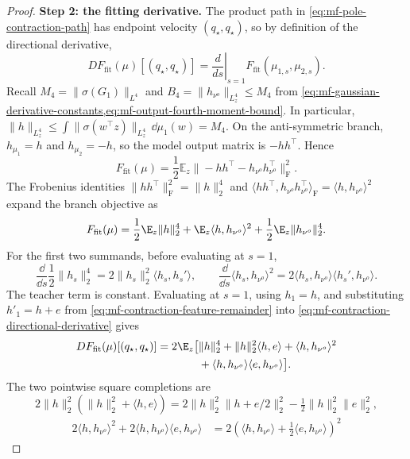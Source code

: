 \begin{proof}
\par\noindent\textbf{Step 2: the fitting derivative.}
The product path in \cref{eq:mf-pole-contraction-path} has endpoint velocity
\((q_\star,q_\star)\), so by definition of the directional derivative,
\begin{equation}
\label{eq:mf-contraction-directional-derivative}
 DF_{\mathrm{fit}}(\mu)[(q_\star,q_\star)]
 =\left.\frac d{ds}\right|_{s=1}
   F_{\mathrm{fit}}(\mu_{1,s},\mu_{2,s}).
\end{equation}
Recall \(M_4=\|\sigma(G_1)\|_{L^4}\) and
\(B_4=\|h_{\nu^o}\|_{L^4_z}\le M_4\) from
\cref{eq:mf-gaussian-derivative-constants,eq:mf-output-fourth-moment-bound}.
In particular,
\(\|h\|_{L^4_z}\le\int\|\sigma(w^\top z)\|_{L^4_z}\,\dd\mu_1(w)=M_4\).
On the anti-symmetric branch,
\(h_{\mu_1}=h\) and \(h_{\mu_2}=-h\), so the model output matrix is
\(-hh^\top\).  Hence
\[
 F_{\mathrm{fit}}(\mu)
 =\frac12\mathbb E_z
   \|-hh^\top-h_{\nu^o}h_{\nu^o}^\top\|_{\mathrm F}^2.
\]
The Frobenius identities
\(\|hh^\top\|_{\mathrm F}^2=\|h\|_2^4\) and
\(\langle hh^\top,h_{\nu^o}h_{\nu^o}^\top\rangle_{\mathrm F}
=\langle h,h_{\nu^o}\rangle^2\) expand the branch objective as
\begin{equation}
\label{eq:mf-branch-energy-expansion}
 F_{\mathrm{fit}}(\mu)
 =\frac12\E_z\|h\|_2^4
  +\E_z\langle h,h_{\nu^o}\rangle^2
  +\frac12\E_z\|h_{\nu^o}\|_2^4.
\end{equation}
For the first two summands, before evaluating at \(s=1\),
\[
 \frac{\dd}{\dd s}\frac12\|h_s\|_2^4
 =2\|h_s\|_2^2\langle h_s,h_s'\rangle,\qquad
 \frac{\dd}{\dd s}\langle h_s,h_{\nu^o}\rangle^2
 =2\langle h_s,h_{\nu^o}\rangle\langle h_s',h_{\nu^o}\rangle.
\]
The teacher term is constant.  Evaluating at \(s=1\), using \(h_1=h\),
and substituting \(h'_1=h+e\) from
\cref{eq:mf-contraction-feature-remainder} into
\cref{eq:mf-contraction-directional-derivative} gives
\begin{align}
 DF_{\mathrm{fit}}(\mu)[(q_\star,q_\star)]
 =2\E_z\bigl[&\|h\|_2^4+\|h\|_2^2\langle h,e\rangle
   +\langle h,h_{\nu^o}\rangle^2\notag\\
   &+\langle h,h_{\nu^o}\rangle\langle e,h_{\nu^o}\rangle\bigr].
\end{align}
The two pointwise square completions are
\[
 2\|h\|_2^2(\|h\|_2^2+\langle h,e\rangle)
 =2\|h\|_2^2\|h+e/2\|_2^2-\tfrac12\|h\|_2^2\|e\|_2^2,
\]
\[
\begin{aligned}
 2\langle h,h_{\nu^o}\rangle^2
 +2\langle h,h_{\nu^o}\rangle\langle e,h_{\nu^o}\rangle
 &=2(\langle h,h_{\nu^o}\rangle+\tfrac12\langle e,h_{\nu^o}\rangle)^2

\end{aligned}\]
\end{proof}
